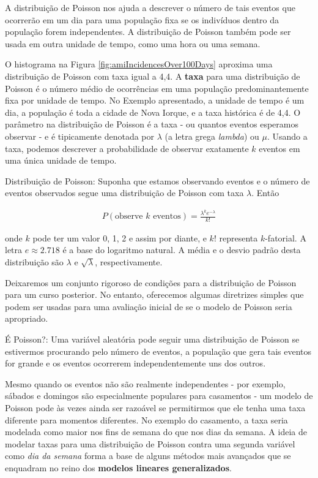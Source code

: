 \documentclass[
]{book}
\theoremstyle{definition}
\theoremstyle{definition}
\theoremstyle{definition}
\theoremstyle{definition}
\theoremstyle{remark}
\begin{document}
A distribuição de Poisson nos ajuda a descrever o número de tais eventos que ocorrerão em um dia para uma população fixa se os indivíduos dentro da população forem independentes. A distribuição de Poisson também pode ser usada em outra unidade de tempo, como uma hora ou uma semana.

O histograma na Figura \ref{fig:amiIncidencesOver100Days} aproxima uma distribuição de Poisson com taxa igual a 4,4. A \textbf{taxa} para uma distribuição de Poisson é o número médio de ocorrências em uma população predominantemente fixa por unidade de tempo. No Exemplo apresentado, a unidade de tempo é um dia, a população é toda a cidade de Nova Iorque, e a taxa histórica é de 4,4. O parâmetro na distribuição de Poisson é a taxa - ou quantos eventos esperamos observar - e é tipicamente denotada por \(\lambda\) (a letra grega \emph{lambda}) ou \(\mu\). Usando a taxa, podemos descrever a probabilidade de observar exatamente \(k\) eventos em uma única unidade de tempo.

Distribuição de Poisson: Suponha que estamos observando eventos e o número de eventos observados segue uma distribuição de Poisson com taxa \(\lambda\). Então

\begin{align*}
P(\text{observe $k$ eventos}) = \frac{\lambda^{k} e^{-\lambda}}{k!}
\end{align*}

onde \(k\) pode ter um valor 0, 1, 2 e assim por diante, e \(k!\) representa \(k\)-fatorial. A letra \(e\approx2.718\) é a base do logaritmo natural. A média e o desvio padrão desta distribuição são \(\lambda\) e \(\sqrt{\lambda}\), respectivamente.

Deixaremos um conjunto rigoroso de condições para a distribuição de Poisson para um curso posterior. No entanto, oferecemos algumas diretrizes simples que podem ser usadas para uma avaliação inicial de se o modelo de Poisson seria apropriado.

É Poisson?: Uma variável aleatória pode seguir uma distribuição de Poisson se estivermos procurando pelo número de eventos, a população que gera tais eventos for grande e os eventos ocorrerem independentemente uns dos outros.

Mesmo quando os eventos não são realmente independentes - por exemplo, sábados e domingos são especialmente populares para casamentos - um modelo de Poisson pode às vezes ainda ser razoável se permitirmos que ele tenha uma taxa diferente para momentos diferentes. No exemplo do casamento, a taxa seria modelada como maior nos fins de semana do que nos dias da semana. A ideia de modelar taxas para uma distribuição de Poisson contra uma segunda variável como \emph{dia da semana} forma a base de alguns métodos mais avançados que se enquadram no reino dos \textbf{modelos lineares generalizados}.
\end{document}
